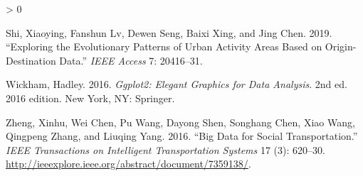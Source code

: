 \documentclass[
]{article}
\newlength{\cslhangindent}
\newenvironment{CSLReferences}[2] %
 {%
  \setlength{\parindent}{0pt}
  \ifodd #1 \everypar{\setlength{\hangindent}{\cslhangindent}}\ignorespaces\fi
  \ifnum #2 > 0
  \setlength{\parskip}{#2\baselineskip}
  \fi
 }%
 {}
\begin{document}
\begin{CSLReferences}{1}{0}
\leavevmode\hypertarget{ref-shi_exploring_2019}{}%
Shi, Xiaoying, Fanshun Lv, Dewen Seng, Baixi Xing, and Jing Chen. 2019. {``Exploring the Evolutionary Patterns of Urban Activity Areas Based on Origin-Destination Data.''} \emph{IEEE Access} 7: 20416--31.

\leavevmode\hypertarget{ref-wickham_ggplot2_2016}{}%
Wickham, Hadley. 2016. \emph{Ggplot2: {Elegant Graphics} for {Data Analysis}}. 2nd ed. 2016 edition. {New York, NY}: {Springer}.

\leavevmode\hypertarget{ref-zheng_big_2016}{}%
Zheng, Xinhu, Wei Chen, Pu Wang, Dayong Shen, Songhang Chen, Xiao Wang, Qingpeng Zhang, and Liuqing Yang. 2016. {``Big Data for Social Transportation.''} \emph{IEEE Transactions on Intelligent Transportation Systems} 17 (3): 620--30. \url{http://ieeexplore.ieee.org/abstract/document/7359138/}.

\end{CSLReferences}
\end{document}
